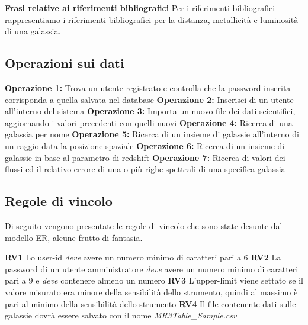 \documentclass[12pt,a4paper,onecolumn,x11names]{article}
\begin{document}
	\begin{framed}
		\begin{flushleft}
			\textbf{Frasi relative ai riferimenti bibliografici}\newline
			Per i riferimenti bibliografici rappresentiamo i riferimenti bibliografici per la distanza, metallicità e luminosità di una galassia.
		\end{flushleft}
	\end{framed}
	
	\subsection{Operazioni sui dati}
		\begin{flushleft}
			\textbf{Operazione 1:} Trova un utente registrato e controlla che la password inserita corrisponda a quella salvata nel database\newline\newline
			\textbf{Operazione 2:} Inserisci di un utente all'interno del sistema\newline\newline
			\textbf{Operazione 3:} Importa un nuovo file dei dati scientifici, aggiornando i valori precedenti con quelli nuovi\newline\newline
			\textbf{Operazione 4:} Ricerca di una galassia per nome\newline\newline
			\textbf{Operazione 5:} Ricerca di un insieme di galassie all'interno di un raggio data la posizione spaziale\newline\newline
			\textbf{Operazione 6:} Ricerca di un insieme di galassie in base al parametro di redshift\newline\newline
			\textbf{Operazione 7:} Ricerca di valori dei flussi ed il relativo errore di una o più righe spettrali di una specifica galassia
		\end{flushleft}
	
	\subsection{Regole di vincolo}
		Di seguito vengono presentate le regole di vincolo che sono state desunte dal modello ER, alcune frutto di fantasia.
		
		\begin{flushleft}
			\textbf{RV1} Lo user-id \textit{deve} avere un numero minimo di caratteri pari a 6\newline
			\textbf{RV2} La password di un utente amministratore \textit{deve} avere un numero minimo di caratteri pari a 9 e \textit{deve} contenere almeno un numero\newline
			\textbf{RV3} L'upper-limit viene settato se il valore misurato era minore della sensibilità dello strumento, quindi al massimo è pari al minimo della sensibilità dello strumento
			\textbf{RV4} Il file contenente dati sulle galassie dovrà essere salvato con il nome \textit{MR3Table\_Sample.csv}
		\end{flushleft}
\end{document}
